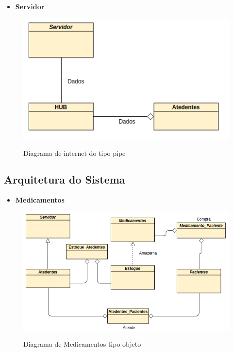              
         \begin{itemize}
         
    \item \textbf{Servidor}
  \end{itemize}
\begin{figure}[H]
              \begin{center}
                  \caption{Diagrama de internet do tipo pipe} \label{afp}
                  \includegraphics[width=15cm]{Pictures/DiagramaDeServidorTipoObjeto.png} \\

              \end{center}
             \end{figure}



    \subsection{Arquitetura do Sistema}
    
    \begin{itemize}
    
    \item \textbf{Medicamentos}
  \end{itemize}
\begin{figure}[H]
              \begin{center}
                  \caption{Diagrama de Medicamentos tipo objeto} \label{afp}
                  \includegraphics[width=15cm]{Pictures/DiagramaMedicamentoTipoObjeto.png} \\

              \end{center}
             \end{figure}
             
